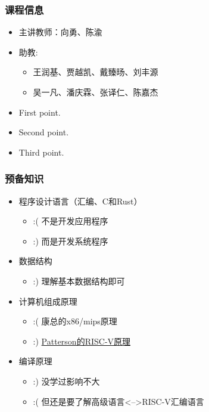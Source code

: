 	
\begin{frame}
	\frametitle{课程信息}
	\begin{itemize}
		\item 主讲教师：向勇、陈渝

		\item 助教: 
\begin{itemize}
		\item<3-> 王润基、贾越凯、戴臻旸、刘丰源

		\item<3-> 吴一凡、潘庆霖、张译仁、陈嘉杰
	\end{itemize}
	\end{itemize}

\begin{itemize}
	\item<1-> First point.
	\item<2-> Second point.
	\item<3-> Third point.
\end{itemize}


\end{frame}

\begin{frame}

\frametitle{预备知识}

\begin{itemize}

\item 程序设计语言（汇编、C和Rust）
  \begin{itemize}
    \item :( 不是开发应用程序
    \item :) 而是开发系统程序
    \pause
  \end{itemize}
\item 数据结构
  \begin{itemize}
    \item :) 理解基本数据结构即可 
  \end{itemize}
\pause
\item 计算机组成原理
  \begin{itemize}
    \item :( 康总的x86/mips原理 
    \item  :)  \href{http://crva.ict.ac.cn/documents/RISC-V-Reader-Chinese-v2p1.pdf}{Patterson的RISC-V原理}
  \end{itemize}
\pause
\item 编译原理
  \begin{itemize}
    \item :) 没学过影响不大  
    \item :( 但还是要了解高级语言<-->RISC-V汇编语言

  \end{itemize}

\end{itemize}

\end{frame}

